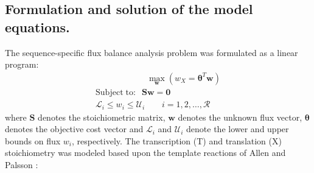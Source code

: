 \documentclass[journal=asbcd6,manuscript=article]{achemso}
\begin{document}
\subsection*{Formulation and solution of the model equations.}
The sequence-specific flux balance analysis problem was formulated as a linear program:
\begin{equation}
 \begin{multlined}
	\qquad \qquad \qquad \max_{\boldsymbol{w}}{} \! \left( w_{X} = \mathbf{\boldsymbol{\theta}}^T \boldsymbol{w} \right) \\
	\mathrm{Subject \; to:}
	 \; \; \mathbf{S}\mathbf{w}=\mathbf{0} \\
\mathcal{L}_{i} \leq w_i \leq \mathcal{U}_{i}  \qquad i=1,2,\hdots,\mathcal{R}
 \end{multlined}
\end{equation}
where $\mathbf{S}$ denotes the stoichiometric matrix, $\mathbf{w}$ denotes the unknown flux vector, $\boldsymbol{\theta}$ denotes the objective cost vector
and $\mathcal{L}_{i}$ and $\mathcal{U}_{i}$ denote the lower and upper bounds on flux $w_{i}$, respectively.
The transcription (T) and translation (X) stoichiometry was modeled based upon the template reactions of Allen and Palsson \cite{Allen:2003aa}:
\begin{table}[!]
\centering
    \caption{Transcription and translation template reactions for protein production.}
    \renewcommand{\arraystretch}{1.2}
\label{tbl:parameters}
\end{table}
\end{document}
